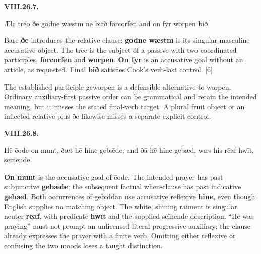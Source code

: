 \par\begin{minipage}{\linewidth}\raggedright
\textbf{VIII.26.7.}

Ǣlc trēo ðe gōdne wæstm ne birð forcorfen and on fȳr worpen bið.

Bare \textbf{ðe} introduces the relative clause; \textbf{gōdne wæstm} is its singular masculine accusative object. The tree is the subject of a passive with two coordinated participles, \textbf{forcorfen} and \textbf{worpen}. \textbf{On fȳr} is an accusative goal without an article, as requested. Final \textbf{bið} satisfies Cook's verb-last control. [6]

The established participle geworpen is a defensible alternative to worpen. Ordinary auxiliary-first passive order can be grammatical and retain the intended meaning, but it misses the stated final-verb target. A plural fruit object or an inflected relative plus ðe likewise misses a separate explicit control.

\end{minipage}\par\addvspace{4pt}

\par\begin{minipage}{\linewidth}\raggedright
\textbf{VIII.26.8.}

Hē ēode on munt, ðæt hē hine gebǣde; and ðā hē hine gebæd, wæs his rēaf hwīt, scīnende.

\textbf{On munt} is the accusative goal of ēode. The intended prayer has past subjunctive \textbf{gebǣde}; the subsequent factual when-clause has past indicative \textbf{gebæd}. Both occurrences of gebiddan use accusative reflexive \textbf{hine}, even though English supplies no matching object. The white, shining raiment is singular neuter \textbf{rēaf}, with predicate \textbf{hwīt} and the supplied scīnende description. “He was praying” must not prompt an unlicensed literal progressive auxiliary; the clause already expresses the prayer with a finite verb. Omitting either reflexive or confusing the two moods loses a taught distinction.

\end{minipage}\par\addvspace{4pt}

